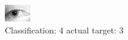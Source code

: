 \begin{figure}[h!]
\begin{center}
\includegraphics[width=0.60\columnwidth]{figures/ID1303_class_4_target_3.png}
\end{center}
\caption{ Classification: 4 actual target: 3}
\label{fig:ID1303_class_4_target_3}
\end{figure}
